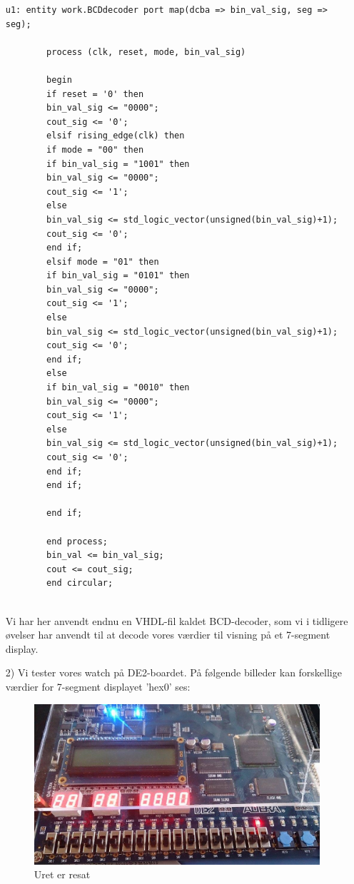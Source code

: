 \begin{enumerate}
\begin{lstlisting}[caption={VHDL code for binary circular counter},label={lst:Counter}]
		u1: entity work.BCDdecoder port map(dcba => bin_val_sig, seg => seg);
		
		process (clk, reset, mode, bin_val_sig)
		
		begin
		if reset = '0' then
		bin_val_sig <= "0000";
		cout_sig <= '0';
		elsif rising_edge(clk) then
		if mode = "00" then
		if bin_val_sig = "1001" then 
		bin_val_sig <= "0000";
		cout_sig <= '1';
		else
		bin_val_sig <= std_logic_vector(unsigned(bin_val_sig)+1);
		cout_sig <= '0';
		end if;
		elsif mode = "01" then
		if bin_val_sig = "0101" then 
		bin_val_sig <= "0000";
		cout_sig <= '1';
		else
		bin_val_sig <= std_logic_vector(unsigned(bin_val_sig)+1);
		cout_sig <= '0';
		end if;
		else 
		if bin_val_sig = "0010" then 
		bin_val_sig <= "0000";
		cout_sig <= '1';
		else
		bin_val_sig <= std_logic_vector(unsigned(bin_val_sig)+1);
		cout_sig <= '0';
		end if;
		end if;
		
		end if;
		
		end process;
		bin_val <= bin_val_sig;
		cout <= cout_sig;
		end circular;
		
		\end{lstlisting}
		
		Vi har her anvendt endnu en VHDL-fil kaldet BCD-decoder, som vi i tidligere øvelser har anvendt til at decode vores værdier til visning på et 7-segment display.
		
\item[2)] Vi tester vores watch på DE2-boardet. På følgende billeder kan forskellige værdier for 7-segment displayet 'hex0' ses:
		\begin{figure}[h]
			\centering
			\includegraphics[scale=0.3]{pictures/Oevelse6/opg1/watch0.JPG}
			\caption{Uret er resat}
			\label{fig:alarm0}
		\end{figure}
		

\end{enumerate}
